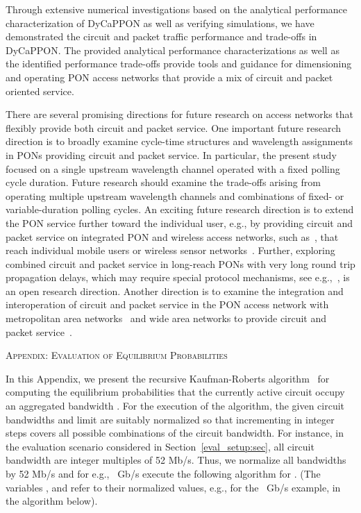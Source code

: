\documentclass[article]{IEEEtran}
\begin{document}
Through extensive numerical investigations based on
the analytical performance characterization of DyCaPPON as well as
verifying simulations, we have demonstrated the
circuit and packet traffic performance and trade-offs in DyCaPPON.
The provided analytical performance characterizations as well
as the identified performance trade-offs provide tools and guidance
for dimensioning and operating PON access networks that
provide a mix of circuit and packet oriented service.

There are several promising directions for
future research on access networks that flexibly
provide both circuit and packet service.
One important future research direction is to broadly
examine cycle-time structures and wavelength assignments in PONs
providing circuit and packet service.
In particular, the present study focused on a single upstream
wavelength channel operated with a fixed polling cycle duration.
Future research should examine the trade-offs arising from
operating multiple upstream wavelength channels and combinations
of fixed- or variable-duration polling cycles.
An exciting future research
direction is to extend the PON service further toward the
individual user, e.g., by providing circuit and packet service
on integrated PON and wireless access networks,
such as~\cite{AuLMR14,Coim13,DhHJ11,LiKK13,MaGR09,Morad13},
that reach individual mobile users or
wireless sensor networks~\cite{HoH11,SeR11,YuZD12}.
Further, exploring combined circuit and packet service in
long-reach PONs with very long round trip propagation delays,
which may require special protocol mechanisms,
see e.g.,~\cite{Mou05,MeMR13,SKM0110},
is an open research direction.
Another direction is to examine the integration and interoperation
of circuit and packet service in the PON access network with
metropolitan area
networks~\cite{BiBC13,MaRe04,MaRW03,ScMRW03,YaMRC03,YuCL10}
and wide area networks to provide
circuit and packet service~\cite{CircuitSONET}.

\vspace{\baselineskip}

\noindent \textsc{Appendix: Evaluation of Equilibrium Probabilities
}

In this Appendix, we present the recursive
Kaufman-Roberts algorithm~\cite[p. 23]{Ross95} for computing the
equilibrium probabilities  that
the currently active circuit occupy an aggregated bandwidth .
For the execution of the algorithm, the given circuit bandwidths
 and limit  are suitably normalized so
that incrementing  in integer steps covers all possible
combinations of the circuit bandwidth. For instance, in the
evaluation scenario considered in Section~\ref{eval_setup:sec}, all
circuit bandwidth are integer multiples of 52 Mb/s. Thus, we
normalize all bandwidths by 52 Mb/s and for e.g., ~Gb/s execute
the following algorithm for . (The
variables , and  refer to their normalized values,
e.g.,  for the ~Gb/s example, in the algorithm below).
\end{document}
